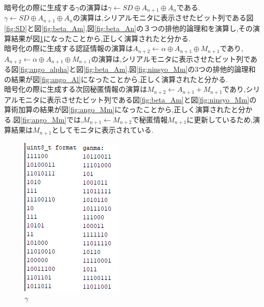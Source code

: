 暗号化の際に生成する$\gamma$の演算は$\gamma \leftarrow SD \oplus A_{n+1} \oplus A_n$である.
$\gamma \leftarrow SD \oplus A_{n+1} \oplus A_n$の演算は,シリアルモニタに表示させたビット列である図\ref{fig:SD}と図\ref{fig:beta_Am},図\ref{fig:beta_An}の３つの排他的論理和を演算し,その演算結果が図\ref{fig:gamma}になったことから,正しく演算されたと分かる.\\
暗号化の際に生成する認証情報の演算は$A_{n+2} \leftarrow \alpha \oplus A_{n+1} \oplus M_{n+1}$であり,$A_{n+2} \leftarrow \alpha \oplus A_{n+1} \oplus M_{n+1}$の演算は,シリアルモニタに表示させたビット列である図\ref{fig:ango_alpha}と図\ref{fig:beta_Am},図\ref{fig:ninsyo_Mm}の3つの排他的論理和の結果が図\ref{fig:ango_Al}になったことから,正しく演算されたと分かる.\\
暗号化の際に生成する次回秘匿情報の演算は$M_{n+2} \leftarrow A_{n+1} + M_{n+1}$であり,シリアルモニタに表示させたビット列である図\ref{fig:beta_Am}と図\ref{fig:ninsyo_Mm}の算術加算の結果が図\ref{fig:ango_Mm}になったことから,正しく演算されたと分かる.図\ref{fig:ango_Mm}では,$M_{n+1} \leftarrow M_{n+2}$で秘匿情報$M_{n+1}$に更新しているため,演算結果は$M_{n+1}$としてモニタに表示されている.\\

\begin{figure}[H]
\begin{minipage}{0.5\hsize}
\centering
\includegraphics{SD.png}
\caption{$SD$}
\label{fig:SD}
\end{minipage}
\begin{minipage}{0.5\hsize}
\centering
\includegraphics{gamma.png}
\caption{$\gamma$}
\label{fig:gamma}
\end{minipage}
\end{figure}

